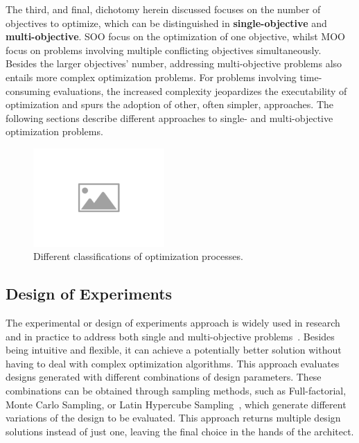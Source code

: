 	The third, and final, dichotomy herein discussed focuses on the number of objectives to optimize, which can be distinguished in \textbf{single-objective} and \textbf{multi-objective}. \ac{SOO} focus on the optimization of one objective, whilst \ac{MOO} focus on problems involving multiple conflicting objectives simultaneously. Besides the larger objectives' number, addressing multi-objective problems also entails more complex optimization problems. For problems involving time-consuming evaluations, the increased complexity jeopardizes the executability of optimization and spurs the adoption of other, often simpler, approaches. The following sections describe different approaches to single- and multi-objective optimization problems. 
	
	\begin{figure}
		\centering
		\includegraphics[width=5cm]{Images/placeholder-image.png}
		\caption{Different classifications of optimization processes.}
		\label{fig:optclassification}
	\end{figure}
	
	\subsection{Design of Experiments}
	\label{ssec:doe}
	
	The experimental or design of experiments approach is widely used in research and in practice to address both single and multi-objective problems~\cite{Fang2017}. Besides being intuitive and flexible, it can achieve a potentially better solution without having to deal with complex optimization algorithms. This approach evaluates designs generated with different combinations of design parameters. These combinations can be obtained through sampling methods, such as Full-factorial, Monte Carlo Sampling, or Latin Hypercube Sampling~\cite{Giunta2003DOE}, which generate different variations of the design to be evaluated. This approach returns multiple design solutions instead of just one, leaving the final choice in the hands of the architect.
	
